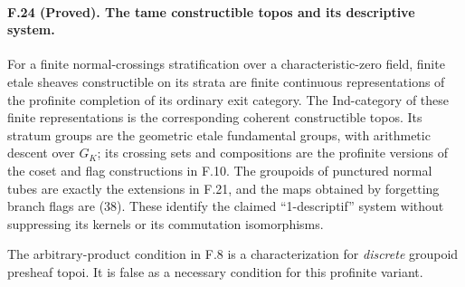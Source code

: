 \paragraph{F.24 (Proved). The tame
constructible topos and its descriptive system.}
For a finite normal-crossings stratification over a characteristic-zero
field, finite etale sheaves constructible on its strata are finite
continuous representations of the profinite completion of its ordinary
exit category. The Ind-category of these finite representations is the
corresponding coherent constructible topos. Its stratum groups are the
geometric etale fundamental groups, with arithmetic descent over $G_K$;
its crossing sets and compositions are the profinite versions of the
coset and flag constructions in F.10. The groupoids of punctured
normal tubes are exactly the extensions in F.21, and the maps obtained
by forgetting branch flags are (38). These identify the claimed
``1-descriptif'' system without suppressing its kernels or its
commutation isomorphisms.

The arbitrary-product condition in F.8 is a characterization for
\emph{discrete} groupoid presheaf topoi. It is false as a necessary
condition for this profinite variant.

